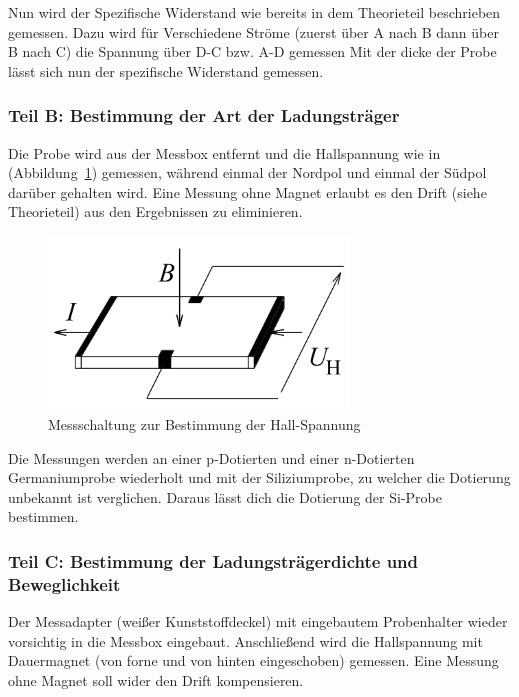 \documentclass[a4paper]{scrartcl}
\numberwithin{equation}{subsection}
\begin{document}
Nun wird der Spezifische Widerstand wie bereits in dem Theorieteil beschrieben gemessen.
Dazu wird für Verschiedene Ströme (zuerst über A nach B dann über B nach C) die Spannung über D-C bzw. A-D gemessen
Mit der dicke der Probe lässt sich nun der spezifische Widerstand gemessen.

\subsubsection{Teil B: Bestimmung der Art der Ladungsträger}

Die Probe wird aus der Messbox entfernt und die Hallspannung wie in (Abbildung~\ref{fig:messchaltung-hall}) gemessen, während einmal der Nordpol und einmal der Südpol darüber gehalten wird. Eine Messung ohne Magnet erlaubt es den Drift (siehe Theorieteil) aus den Ergebnissen zu eliminieren.

\begin{figure}[H]
\includegraphics[width=8cm]{messchaltung_hall}
\centering
\caption{Messschaltung zur Bestimmung der Hall-Spannung \protect\footnotemark}
\centering
\label{fig:messchaltung-hall}
\end{figure}


Die Messungen werden an einer p-Dotierten und einer n-Dotierten Germaniumprobe wiederholt und mit der Siliziumprobe, zu welcher die Dotierung unbekannt ist verglichen. Daraus lässt dich die Dotierung der Si-Probe bestimmen.

\subsubsection{Teil C: Bestimmung der Ladungsträgerdichte und Beweglichkeit}

Der Messadapter (weißer Kunststoffdeckel) mit eingebautem Probenhalter wieder vorsichtig in die Messbox eingebaut.
Anschließend wird die Hallspannung mit Dauermagnet (von forne und von hinten eingeschoben) gemessen.
Eine Messung ohne Magnet soll wider den Drift kompensieren.\\
\end{document}
